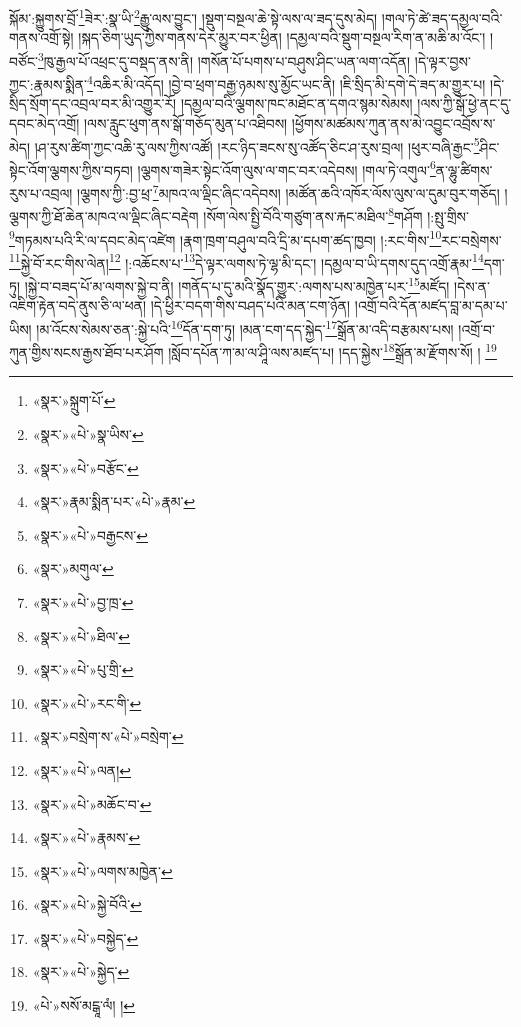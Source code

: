 སྐོམ་:སྐྱུགས་བྲོ་\footnote{«སྣར་»སྐྲུག་པོ་}ཟེར་:སྣ་ཡི་\footnote{«སྣར་»«པེ་»སྣ་ཡིས་}རྒྱུ་ལས་བྱུང་། །སྡུག་བསྔལ་ཆེ་སྟེ་ལས་ལ་ཟད་དུས་མེད། །གལ་ཏེ་ཚེ་ཟད་དམྱལ་བའི་གནས་འགྲོ་སྟེ། །སྐད་ཅིག་ཡུད་ཀྱིས་གནས་དེར་མྱུར་བར་ཕྱིན། །དམྱལ་བའི་སྡུག་བསྔལ་རིག་ན་མཆི་མ་འོང་། །བཙོང་\footnote{«སྣར་»«པེ་»བརྩོང་}ཁུ་རྒྱལ་པོ་འཕྲང་དུ་བསྡད་ནས་ནི། །གསོན་པོ་པགས་པ་བཤུས་ཤིང་ཡན་ལག་འདོན། །དེ་ལྟར་བྱས་ཀྱང་:རྣམས་སྨིན་\footnote{«སྣར་»རྣམ་སྨིན་པར་«པེ་»རྣམ་}འཆིར་མི་འདོད། །བྱེ་བ་ཕྲག་བརྒྱ་ཉམས་སུ་མྱོང་ཡང་ནི། །ཇི་སྲིད་མི་དགེ་དེ་ཟད་མ་གྱུར་པ། །དེ་སྲིད་སྲོག་དང་འབྲལ་བར་མི་འགྱུར་རོ། །དམྱལ་བའི་ལྕགས་ཁང་མཐོང་ན་དགའ་སྙམ་སེམས། །ལས་ཀྱི་སྒོ་ཕྱེ་ནང་དུ་དབང་མེད་འགྲོ། །ལས་རླུང་ཕུག་ནས་སྒོ་གཅོད་མུན་པ་འཐིབས། །ཕྱོགས་མཚམས་ཀུན་ནས་མེ་འབྱུང་འབྲོས་ས་མེད། །ཤ་རུས་ཚིག་ཀྱང་འཆི་རུ་ལས་ཀྱིས་འཚོ། །རང་ཉིད་ཟངས་སུ་འཚོད་ཅིང་ཤ་རུས་བྲལ། །ཕུར་བཞི་རྒྱང་\footnote{«སྣར་»«པེ་»བརྒྱངས་}ཤིང་སྟེང་འོག་ལྕགས་ཀྱིས་བཏབ། །ལྕགས་གཟེར་སྟེང་འོག་ལུས་ལ་གང་བར་འདེབས། །གལ་ཏེ་འགུལ་\footnote{«སྣར་»མགུལ་}ན་ལྷུ་ཚིགས་རུས་པ་འབྲལ། །ལྕགས་ཀྱི་:བྱ་ཕྲ་\footnote{«སྣར་»«པེ་»བྱ་ཁྲ་}མཁའ་ལ་ལྡིང་ཞིང་འདེབས། །མཚོན་ཆའི་འཁོར་ལོས་ལུས་ལ་དུམ་བུར་གཅོད། །ལྕགས་ཀྱི་ཐོ་ཆེན་མཁའ་ལ་ལྡིང་ཞིང་བརྡེག །སོག་ལེས་སྤྱི་བོའི་གཙུག་ནས་རྐང་མཐིལ་\footnote{«སྣར་»«པེ་»ཐིལ་}གཤོག །:སྤུ་གྲིས་\footnote{«སྣར་»«པེ་»པུ་གྲི་}གཏམས་པའི་རི་ལ་དབང་མེད་འཛེག །རྣག་ཁྲག་བཤུལ་བའི་དྲི་མ་དཔག་ཚད་ཁྱབ། །:རང་གིས་\footnote{«སྣར་»«པེ་»རང་གི་}རང་བསྲེགས་\footnote{«སྣར་»བསྲེག་ས་«པེ་»བསྲེག་}སྐྱེ་བོ་རང་གིས་ལེན།\footnote{«སྣར་»«པེ་»ལན།} །:འཆོངས་པ་\footnote{«སྣར་»«པེ་»མཆོང་བ་}དེ་ལྟར་ལགས་ཏེ་ལྷ་མི་དང་། །དམྱལ་བ་ཡི་དགས་དུད་འགྲོ་རྣམ་\footnote{«སྣར་»«པེ་»རྣམས་}དག་ཏུ། །སྐྱེ་བ་བཟད་པོ་མ་ལགས་སྐྱེ་བ་ནི། །གནོད་པ་དུ་མའི་སྣོད་གྱུར་:ལགས་པས་མཁྱེན་པར་\footnote{«སྣར་»«པེ་»ལགས་མཁྱེན་}མཛོད། །དེས་ན་འཇིག་རྟེན་བདེ་ནུས་ཅི་ལ་ཕན། །དེ་ཕྱིར་བདག་གིས་བཤད་པའི་མན་ངག་ཉོན། །འགྲོ་བའི་དོན་མཛད་བླ་མ་དམ་པ་ཡིས། །མ་འོངས་སེམས་ཅན་:སྐྱེ་པའི་\footnote{«སྣར་»«པེ་»སྐྱེ་བོའི་}དོན་དག་ཏུ། །མན་ངག་དད་སྐྱེད་\footnote{«སྣར་»«པེ་»བསྐྱེད་}སྒྲོན་མ་འདི་བརྩམས་པས། །འགྲོ་བ་ཀུན་གྱིས་སངས་རྒྱས་ཐོབ་པར་ཤོག །སློབ་དཔོན་ཀ་མ་ལ་ཤཱི་ལས་མཛད་པ། །དད་སྐྱེས་\footnote{«སྣར་»«པེ་»སྐྱེད་}སྒྲོན་མ་རྫོགས་སོ། ། \footnote{«པེ་»སསོ་མངྒཱ་ལཾ། ། }